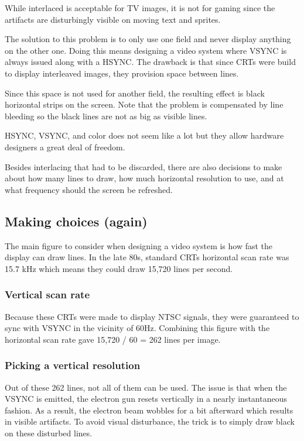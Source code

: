 While interlaced is acceptable for TV images, it is not for gaming since the artifacts are disturbingly visible on moving text and sprites. 

The solution to this problem is to only use one field and never display anything on the other one. Doing this means designing a video system where VSYNC is always issued along with a HSYNC. The drawback is that since CRTs were build to display interleaved images, they provision space between lines. 

Since this space is not used for another field, the resulting effect is black horizontal strips on the screen. Note that the problem is compensated by line bleeding so the black lines are not as big as visible lines.


HSYNC, VSYNC, and color does not seem like a lot but they allow hardware designers a great deal of freedom. 

Besides interlacing that had to be discarded, there are also decisions to make about how many lines to draw, how much horizontal resolution to use, and at what frequency should the screen be refreshed.





\subsection{Making choices (again)}
 The main figure to consider when designing a video system is how fast the display can draw lines. In the late 80s, standard CRTs horizontal scan rate was 15.7 kHz which means they could draw 15,720 lines per second.





\subsubsection{Vertical scan rate}
Because these CRTs were made to display NTSC signals, they were guaranteed to sync with VSYNC in the vicinity of 60Hz. Combining this figure with the horizontal scan rate gave 15,720 / 60 = 262 lines per image.


\subsubsection{Picking a vertical resolution}
Out of these 262 lines, not all of them can be used. The issue is that when the VSYNC is emitted, the electron gun resets vertically in a nearly instantaneous fashion. As a result, the electron beam wobbles for a bit afterward which results in visible artifacts. To avoid visual disturbance, the trick is to simply draw black on these disturbed lines. 

